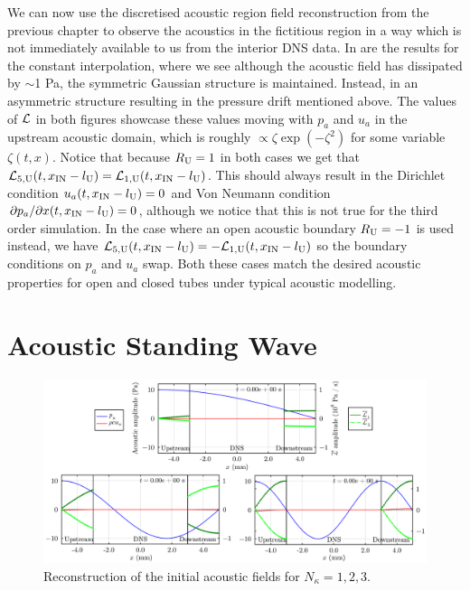 We can now use the discretised acoustic region field reconstruction from the previous chapter to observe the acoustics in the fictitious region in a way which is not immediately available to us from the interior DNS data. In  are the results for the constant interpolation, where we see although the acoustic field has dissipated by $\sim$1 Pa, the symmetric Gaussian structure is maintained. Instead, in  an asymmetric structure resulting in the pressure drift mentioned above. The values of $\cl{L}$ in both figures showcase these values moving with $p_a$ and $u_a$ in the upstream acoustic domain, which is roughly $\propto ζ \exp(-ζ^2)$ for some variable $ζ(t, x)$. Notice that because $R_{\rm{U}} = 1$ in both cases we get that $\cl{L}_{5, \rm{U}}(t, x_{\rm{IN}} - l_{\rm{U}}) = \cl{L}_{1, \rm{U}}(t, x_{\rm{IN}} - l_{\rm{U}})$. This should always result in the Dirichlet condition $u_a(t, x_{\rm{IN}} - l_{\rm{U}}) = 0$ and Von Neumann condition $\partial p_a / \partial x(t, x_{\rm{IN}} - l_{\rm{U}}) = 0$, although we notice that this is not true for the third order simulation. In the case where an open acoustic boundary $R_{\rm{U}} = -1$ is used instead, we have $\cl{L}_{5, \rm{U}}(t, x_{\rm{IN}} - l_{\rm{U}}) = -\cl{L}_{1, \rm{U}}(t, x_{\rm{IN}} - l_{\rm{U}})$ so the boundary conditions on $p_a$ and $u_a$ swap. Both these cases match the desired acoustic properties for open and closed tubes under typical acoustic modelling.




\section{Acoustic Standing Wave}

\begin{figure}[t]
\centering
\includegraphics[scale=0.30]{assets/graphs/ac-plot-wave-modes.pdf}
\caption{Reconstruction of the initial acoustic fields for $N_κ = 1, 2, 3$.}
\label{fig:ac-wave-modes}
\end{figure}

